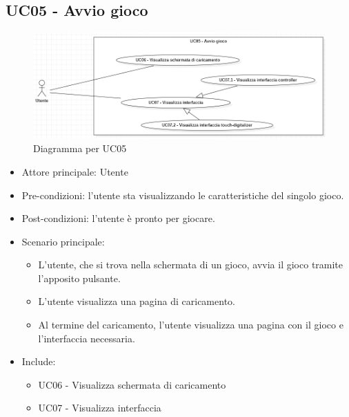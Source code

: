 \subsection{UC05 - Avvio gioco}
\begin{figure}[h]
    \centering
    \includegraphics[width=400pt]{images/usecase/UC05.png}
    \caption{Diagramma per UC05}
    \label{fig:UC05}
\end{figure}
\begin{itemize}
    \item Attore principale: Utente
    \item Pre-condizioni: l'utente sta visualizzando le caratteristiche del singolo gioco.
    \item Post-condizioni: l'utente è pronto per giocare.
    \item Scenario principale: \begin{itemize}
        \item L'utente, che si trova nella schermata di un gioco, avvia il gioco tramite l'apposito pulsante.
        \item L'utente visualizza una pagina di caricamento.
        \item Al termine del caricamento, l'utente visualizza una pagina con il gioco e l'interfaccia necessaria.
    \end{itemize}
    \item Include: \begin{itemize}
        \item UC06 - Visualizza schermata di caricamento
        \item UC07 - Visualizza interfaccia
    \end{itemize}
\end{itemize}

